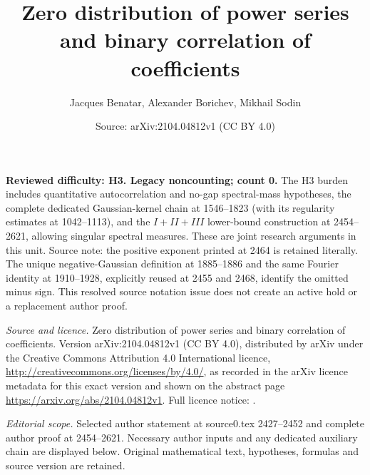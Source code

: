 \documentclass[10pt,a4paper]{amsart}
\title[Author proof 110147]{Zero distribution of power series and binary correlation of coefficients}
\author{Jacques Benatar, Alexander Borichev, Mikhail Sodin}
\date{Source: arXiv:2104.04812v1 (CC BY 4.0)}
\begin{document}
\maketitle
\noindent\textbf{Reviewed difficulty: H3. Legacy noncounting; count 0.} The H3 burden includes quantitative autocorrelation and no-gap spectral-mass hypotheses, the complete dedicated Gaussian-kernel chain at 1546--1823 (with its regularity estimates at 1042--1113), and the $I+II+III$ lower-bound construction at 2454--2621, allowing singular spectral measures. These are joint research arguments in this unit. Source note: the positive exponent printed at 2464 is retained literally. The unique negative-Gaussian definition at 1885--1886 and the same Fourier identity at 1910--1928, explicitly reused at 2455 and 2468, identify the omitted minus sign. This resolved source notation issue does not create an active hold or a replacement author proof.\par\medskip

\noindent\emph{Source and licence.} Zero distribution of power series and binary correlation of coefficients. Version arXiv:2104.04812v1 (CC BY 4.0), distributed by arXiv under the Creative Commons Attribution 4.0 International licence, \url{http://creativecommons.org/licenses/by/4.0/}, as recorded in the arXiv licence metadata for this exact version and shown on the abstract page \url{https://arxiv.org/abs/2104.04812v1}. Full licence notice: .\par\smallskip


\noindent\textit{Editorial scope.} Selected author statement at source0.tex 2427--2452 and complete author proof at 2454--2621. Necessary author inputs and any dedicated auxiliary chain are displayed below. Original mathematical text, hypotheses, formulas and source version are retained.\par\smallskip
\end{document}
